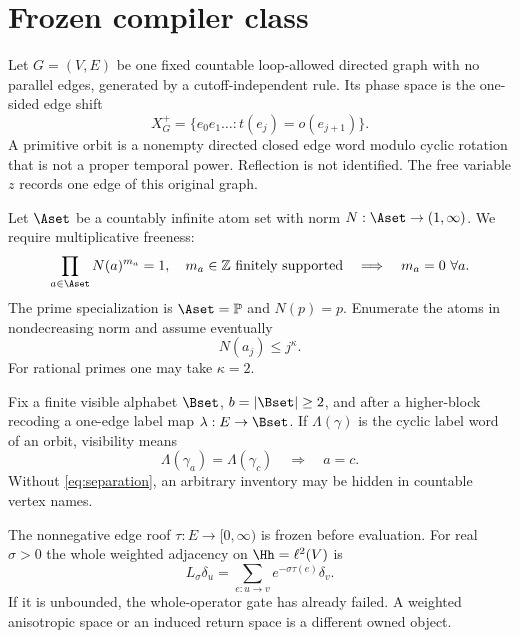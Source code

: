 \section{Frozen compiler class}\label{sec:lock}

\begin{definition}
Let $G=(V,E)$ be one fixed countable loop-allowed directed graph with no
parallel edges, generated by a
cutoff-independent rule.  Its phase space is the one-sided edge shift
\[
X_G^+=\{e_0e_1\ldots:t(e_j)=o(e_{j+1})\}.
\]
A primitive orbit is a nonempty directed closed edge word modulo cyclic
rotation that is not a proper temporal power.  Reflection is not identified.
The free variable $z$ records one edge of this original graph.
\end{definition}

Let $\Aset$ be a countably infinite atom set with norm
$N:\Aset\to(1,\infty)$.  We require multiplicative freeness:
\begin{equation}\label{eq:free}
\prod_{a\in\Aset}N(a)^{m_a}=1,\quad m_a\in\mathbb Z
\text{ finitely supported}
\quad\Longrightarrow\quad m_a=0\ \forall a.
\end{equation}
The prime specialization is $\Aset=\mathbb P$ and $N(p)=p$.  Enumerate the
atoms in nondecreasing norm and assume eventually
\begin{equation}\label{eq:growth}
N(a_j)\le j^\kappa.
\end{equation}
For rational primes one may take $\kappa=2$.

Fix a finite visible alphabet $\Bset$, $b=|\Bset|\ge2$, and after a
higher-block recoding a one-edge label map $\lambda:E\to\Bset$.  If
$\Lambda(\gamma)$ is the cyclic label word of an orbit, visibility means
\begin{equation}\label{eq:separation}
\Lambda(\gamma_a)=\Lambda(\gamma_c)\quad\Longrightarrow\quad a=c.
\end{equation}
Without \eqref{eq:separation}, an arbitrary inventory may be hidden in
countable vertex names.

The nonnegative edge roof $\tau:E\to[0,\infty)$ is frozen before evaluation.
For real $\sigma>0$ the whole weighted adjacency on $\Hh=\ell^2(V)$ is
\begin{equation}\label{eq:whole}
L_\sigma\delta_u=\sum_{e:u\to v}e^{-\sigma\tau(e)}\delta_v.
\end{equation}
If it is unbounded, the whole-operator gate has already failed.  A weighted
anisotropic space or an induced return space is a different owned object.

